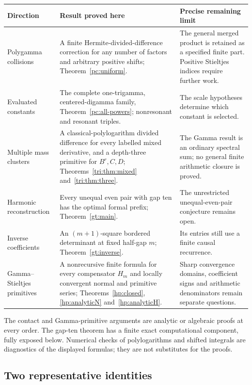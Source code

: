 \documentclass[11pt,a4paper]{article}
\theoremstyle{definition}
\theoremstyle{remark}
\numberwithin{equation}{section}
\begin{document}
\begin{longtable}{@{}>{\raggedright\arraybackslash}p{}>{\raggedright\arraybackslash}p{}>{\raggedright\arraybackslash}p{}@{}}
\toprule
Direction & Result proved here & Precise remaining limit\\
\midrule
\endhead
Polygamma collisions & A finite Hermite-divided-difference correction
for any number of factors and arbitrary positive shifts;
Theorem~\ref{pc:uniform}. & The general merged product is retained as a
specified finite part. Positive Stieltjes indices require further work.\\[5pt]
Evaluated constants & The complete one-trigamma, centered-digamma family,
Theorem~\ref{pc:all-powers}; nonresonant and resonant triples. & The scale
hypotheses determine which constant is selected.\\[5pt]
Multiple mass clusters & A classical-polylogarithm divided difference
for every labelled mixed derivative, and a depth-three primitive for
$B^r,C,D$; Theorems~\ref{tri:thm:mixed} and~\ref{tri:thm:three}.
& The Gamma result is an ordinary spectral sum; no general finite
arithmetic closure is proved.\\[5pt]
Harmonic reconstruction & Every unequal even pair with gap ten has the
optimal formal prefix; Theorem~\ref{gt:main}. & The unrestricted
unequal-even-pair conjecture remains open.\\[5pt]
Inverse coefficients & An $(m+1)$-square bordered determinant at fixed
half-gap $m$; Theorem~\ref{gt:inverse}. & Its entries still use a finite
causal recurrence.\\[5pt]
Gamma--Stieltjes primitives & A nonrecursive finite formula for every
compensator $H_m$ and locally convergent normal and primitive series;
Theorems~\ref{hp:closed}, \ref{hp:analyticN} and~\ref{hp:analyticH}.
& Sharp convergence domains, coefficient signs and arithmetic
denominators remain separate questions.\\
\bottomrule
\end{longtable}

The contact and Gamma-primitive arguments are analytic or algebraic
proofs at every order. The gap-ten theorem has a finite exact
computational component, fully exposed below. Numerical checks of
polylogarithms and shifted integrals are diagnostics of the displayed
formulas; they are not substitutes for the proofs.

\subsection{Two representative identities}
\end{document}
